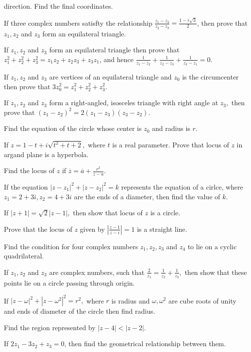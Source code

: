   direction. Find the final coordinates.
\item If three complex numbers satisfty the relationship $\frac{z_1 - z_3}{z_2 - z_3} = \frac{1 - i\sqrt{3}}{2}$, then
  prove that $z_1, z_2$ and $z_3$ form an equilateral triangle.
\item If $z_1, z_2$ and $z_3$ form an equilateral triangle then prove that $z_1^2 + z_2^2 + z_3^2 = z_1z_2 + z_2z_3
  +z_3z_1$, and hence $\frac{1}{z_1 - z_2} + \frac{1}{z_2 - z_3} + \frac{1}{z_3 - z_1} = 0$.
\item If $z_1, z_2$ and $z_3$ are vertices of an equilateral triangle and $z_0$ is the circumcenter then prove that
  $3z_0^2 = z_1^2 + z_2^2 + z_3^2.$
\item If $z_1, z_2$ and $z_3$ form a right-angled, isosceles triangle with right angle at $z_3,$ then prove that $(z_1 -
  z_2)^2 = 2(z_1 - z_3)(z_3 - z_2)$.
\item Find the equation of the circle whose center is $z_0$ and radius is $r$.
\item If $z = 1 - t + i\sqrt{t^2 + t + 2},$ where $t$ is a real parameter. Prove that locus of $z$ in argand plane is a
  hyperbola.
\item Find the locus of $z$ if $\overline{z} = \overline{a} + \frac{r^2}{z - a}$.
\item If the equation $|z - z_1|^2 + |z - z_2|^2 = k$ represents the equation of a cirlce, where $z_1 = 2 + 3i, z_2 = 4 +
  3i$ are the ends of a diameter, then find the value of $k$.
\item If $|z + 1| = \sqrt{2}|z - 1|,$ then show that locus of $z$ is a circle.
\item Prove that the locus of $z$ given by $\left|\frac{z - 1}{z - i}\right| = 1$ is a straight line.
\item Find the condition for four complex numbers $z_1, z_2, z_3$ and $z_4$ to lie on a cyclic quadrilateral.
\item If $z_1, z_2$ and $z_3$ are complex numbers, such that $\frac{2}{z_1} = \frac{1}{z_2} + \frac{1}{z_3},$ then show
  that these points lie on a circle passing through origin.
\item If $|z - \omega|^2 + |z - \omega^2|^2 = r^2,$ where $r$ is radius and $\omega, \omega^2$ are cube roots of unity
  and ends of diameter of the circle then find radius.
\item Find the region represented by $|z - 4| < |z - 2|$.
\item If $2z_1 - 3z_2 + z_3 = 0$, then find the geometrical relationship between them.
